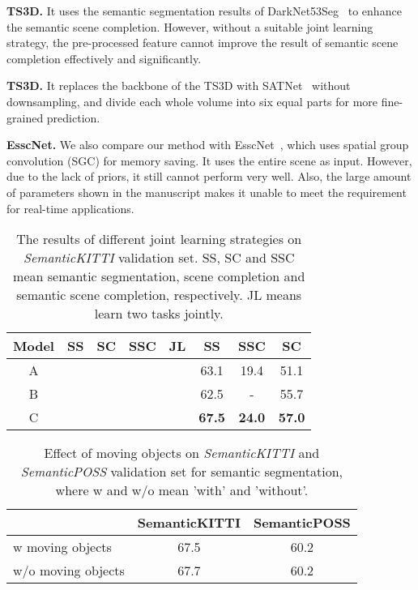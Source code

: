 \documentclass[letterpaper]{article} \usepackage{aaai21}  \usepackage{times}  \usepackage{helvet} \usepackage{courier}  \usepackage[hyphens]{url}  \usepackage{graphicx} \urlstyle{rm} \def\UrlFont{\rm}  \usepackage{natbib}  \usepackage{booktabs}
\begin{document}
	\noindent\textbf{TS3D.} It uses the semantic segmentation results of DarkNet53Seg~\cite{behley2019semantickitti} to enhance the semantic scene completion. However, without a suitable joint learning strategy, the pre-processed feature cannot improve the result of semantic scene completion effectively and significantly. 
	
	\noindent\textbf{TS3D.} It replaces the backbone of the TS3D with SATNet~\cite{liu2018see} without downsampling, and divide each whole volume into six equal parts for more fine-grained prediction. 
	
	\noindent\textbf{EsscNet.} We also compare our method with  EsscNet~\cite{Jiahui2019Efficient}, which uses spatial group convolution (SGC) for memory saving. It uses the entire scene as input. However, due to the lack of priors, it still cannot perform very well. Also, the large amount of parameters shown in the manuscript makes it unable to meet the requirement for real-time applications.
	


		\begin{table}
	\small
	\caption{The results of different joint learning strategies on \textit{SemanticKITTI} validation set. SS,  SC and SSC mean semantic segmentation, scene completion and semantic scene completion, respectively. JL means learn two tasks jointly.}

	\begin{center}
		\begin{tabular}{c|cccc|c|cc}
		\hline
		Model & SS & SC & SSC & JL  & SS & SSC & SC\\
		\hline
		\hline
		A & \cmark &   &  &
		& 63.1 & 19.4 & 51.1\\
		B & \cmark & \cmark &  
		& \cmark & 62.5 & - & 55.7\\
		C & \cmark & & \cmark  
		& \cmark & \bf{67.5} &\bf{24.0} &\bf{57.0}\\
		\hline
	    \end{tabular}
		\end{center}
		
		\label{tab:sc}
	\end{table}
	
	    \begin{table}
	\small

	\begin{center}
	\caption{Effect of moving objects on \textit{SemanticKITTI} and \textit{SemanticPOSS} validation set for semantic segmentation, where w and w/o mean 'with' and 'without'.}
	\begin{tabular}{lcc}
		\hline
		& SemanticKITTI & SemanticPOSS \\
		\hline
		\hline
		w moving objects &  67.5 & 60.2 \\
		w/o moving objects &  {67.7}  &  60.2\\
		\hline
	\end{tabular}
		\label{tab:mov}
	\end{center}

	\end{table}
	
\end{document}
